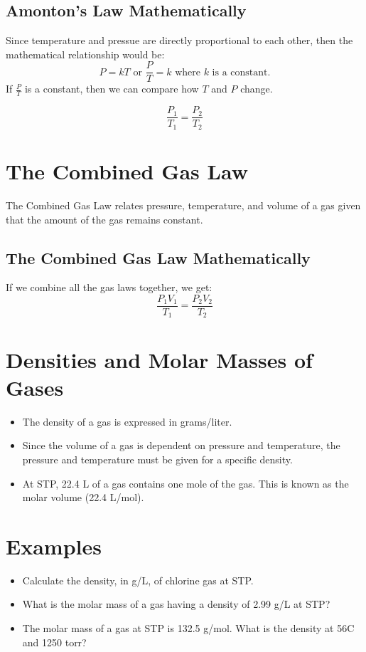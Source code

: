 \documentclass[
	chapter=5,
	title={Gases},
	showanswers=true,
]{chem122notes}
\begin{document}
\subsection{Amonton's Law Mathematically}\label{subsec:amontons-law-mathematically}
Since temperature and pressue are directly proportional to each other, then the mathematical relationship would be:
\[ P = kT \mbox{  or  } \frac{P}{T} = k \mbox{   where } k \mbox{ is a constant.} \]
If $\frac{P}{T}$ is a constant, then we can compare how $T$ and $P$ change.

\begin{equation}
	\frac{P_{1}}{T_{1}} = \frac{P_{2}}{T_{2}}
	\label{eq:amontons-law-mathematically}
\end{equation}

\section{The Combined Gas Law}\label{sec:the-combined-gas-law}
The Combined Gas Law relates pressure, temperature, and volume of a gas given that the amount of the gas remains constant.

\subsection{The Combined Gas Law Mathematically}\label{subsec:the-combined-gas-law-mathematically}
If we combine all the gas laws together, we get:
\begin{equation}
	\frac{P_{1}V_{1}}{T_{1}} = \frac{P_{2}V_{2}}{T_{2}}
	\label{eq:combined-gas-law}
\end{equation}

\section{Densities and Molar Masses of Gases}\label{sec:densities-and-molar-masses-of-gases}
\begin{itemize}
	\item The density of a gas is expressed in grams/liter.
	\item Since the volume of a gas is dependent on pressure and temperature, the pressure and temperature must be given for a specific density.
	\item At STP, 22.4 L of a gas contains one mole of the gas. This is known as the molar volume\label{dfn:molar-volume} (22.4 L/mol).
\end{itemize}

\section{Examples}\label{sec:examples-2}
\begin{itemize}
	\item Calculate the density, in g/L, of chlorine gas at STP\@.
	\item What is the molar mass of a gas having a density of 2.99 g/L at STP?
	\item The molar mass of a gas at STP is 132.5 g/mol. What is the density at 56\textdegree{}C and 1250 torr?
\end{itemize}
\end{document}
